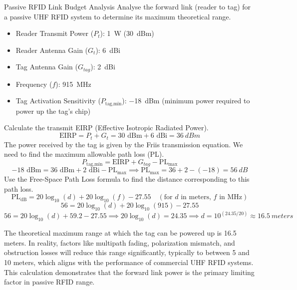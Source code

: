 \begin{workedexample}{Passive RFID Link Budget Analysis}
     Analyse the forward link (reader to tag) for a passive UHF RFID system to determine its maximum theoretical range.
    \begin{itemize}
        \item Reader Transmit Power ($P_t$): \qty{1}{W} (\qty{30}{dBm})
        \item Reader Antenna Gain ($G_t$): \qty{6}{dBi}
        \item Tag Antenna Gain ($G_{tag}$): \qty{2}{dBi}
        \item Frequency ($f$): \qty{915}{MHz}
        \item Tag Activation Sensitivity ($P_{\text{tag,min}}$): \qty{-18}{dBm} (minimum power required to power up the tag's chip)
    \end{itemize}
    \begin{derivationsteps}
        \step Calculate the transmit EIRP (Effective Isotropic Radiated Power).
        \[ \text{EIRP} = P_t + G_t = 30 \text{ dBm} + 6 \text{ dBi} = \qty{36}{dBm} \]
        \step The power received by the tag is given by the Friis transmission equation. We need to find the maximum allowable path loss (PL).
        \[ P_{\text{tag,min}} = \text{EIRP} + G_{tag} - \text{PL}_{\max} \]
        \[ -18 \text{ dBm} = 36 \text{ dBm} + 2 \text{ dBi} - \text{PL}_{\max} \implies \text{PL}_{\max} = 36 + 2 - (-18) = \qty{56}{dB} \]
        \step Use the Free-Space Path Loss formula to find the distance corresponding to this path loss.
        \[ \text{PL}_{\text{dB}} = 20\log_{10}(d) + 20\log_{10}(f) - 27.55 \quad (\text{for } d \text{ in meters, } f \text{ in MHz}) \]
        \[ 56 = 20\log_{10}(d) + 20\log_{10}(915) - 27.55 \]
        \[ 56 = 20\log_{10}(d) + 59.2 - 27.55 \implies 20\log_{10}(d) = 24.35 \implies d = 10^{(24.35/20)} \approx \qty{16.5}{meters} \]
    \end{derivationsteps}
     The theoretical maximum range at which the tag can be powered up is 16.5 meters. In reality, factors like multipath fading, polarization mismatch, and obstruction losses will reduce this range significantly, typically to between 5 and 10 meters, which aligns with the performance of commercial UHF RFID systems. This calculation demonstrates that the forward link power is the primary limiting factor in passive RFID range.
\end{workedexample}



